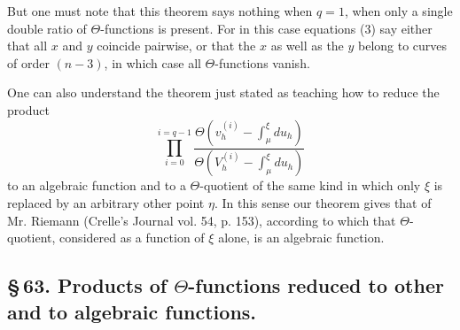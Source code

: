 \documentclass[10pt]{article}
\begin{document}
But one must note that this theorem says nothing when \(q=1\), when only a single double ratio of \(\Theta\)-functions is present. For in this case equations (3) say either that all \(x\) and \(y\) coincide pairwise, or that the \(x\) as well as the \(y\) belong to curves of order \((n-3)\), in which case all \(\Theta\)-functions vanish.

One can also understand the theorem just stated as teaching how to reduce the product
\[
\prod_{i=0}^{i=q-1}
\frac{\Theta\left(v_h^{(i)}-\int_{\mu}^{\xi}du_h\right)}
     {\Theta\left(V_h^{(i)}-\int_{\mu}^{\xi}du_h\right)}
\]
to an algebraic function and to a \(\Theta\)-quotient of the same kind in which only \(\xi\) is replaced by an arbitrary other point \(\eta\). In this sense our theorem gives that of Mr. Riemann (Crelle's Journal vol. 54, p. 153), according to which that \(\Theta\)-quotient, considered as a function of \(\xi\) alone, is an algebraic function.

\subsection*{\S\,63. Products of \(\Theta\)-functions reduced to other and to algebraic functions.}
\end{document}

